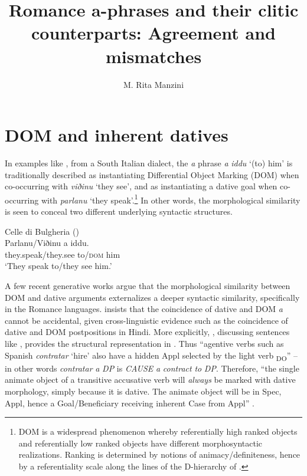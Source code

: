 \documentclass[output=paper,colorlinks,citecolor=brown,nonflat]{./langscibook}
\author{M. Rita Manzini\affiliation{Università di Firenze}}
\title{Romance a-phrases and their clitic counterparts: Agreement and mismatches}
\begin{document}
\maketitle 
{}



\section{DOM and inherent datives}\label{sec:manzini:1}

In examples like , from a South Italian dialect, the \textit{a} phrase \textit{a} \textit{iddu} ‘(to) him’ is traditionally described as instantiating Differential Object Marking (DOM) when co-occurring with \textit{viðinu} ‘they see’, and as instantiating a dative goal when co-occurring with \textit{parlanu} ‘they speak’.\footnote{DOM is a widespread phenomenon \citep{Bossong1985} whereby referentially high ranked objects and referentially low ranked objects have different morphosyntactic realizations. Ranking is determined by notions of animacy/definiteness, hence by a referentiality scale along the lines of the D-hierarchy of \citet{Kiparsky2008}.}  In other words, the morphological similarity is seen to conceal two different underlying syntactic structures.

\ea%
    \label{ex:manzini:1}
    {Celle di Bulgheria (\citealt{ManziniSavoia2005})}\\
    \gll Parlanu/Viðinu a iddu.\\
        they.speak/they.see to/\textsc{dom} him\\
    \glt ‘They speak to/they see him.’        
\z

A few recent generative works argue that the morphological similarity between DOM and dative arguments externalizes a deeper syntactic similarity, specifically in the Romance languages. \citet{Torrego1998} insists that the coincidence of dative and DOM \textit{a} cannot be accidental, given cross-linguistic evidence such as the coincidence of dative and DOM postpositions in Hindi. More explicitly, \citet{Torrego2010}, discussing sentences like , provides the structural representation in . Thus “agentive verbs such as Spanish \textit{contratar} ‘hire’ also have a hidden Appl selected by the light verb \liv\textsubscript{DO}” – in other words \textit{contratar} \textit{a} \textit{DP} is \textit{CAUSE} \textit{a} \textit{contract} \textit{to} \textit{DP}. Therefore, “the single animate object of a transitive accusative verb will \textit{always} be marked with dative morphology, simply because it is dative. The animate object will be in Spec, Appl, hence a Goal/Beneficiary receiving inherent Case from Appl” \citep[462]{Torrego2010}. 
\end{document}
